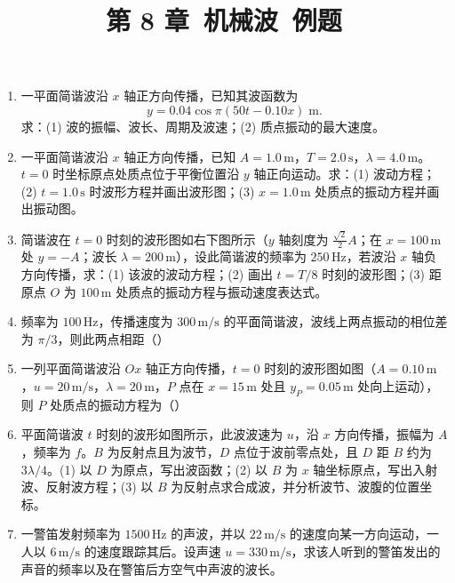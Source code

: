 \documentclass[12pt]{article}
\title{第 8 章\ 机械波\ 例题}
\author{}
\date{}
\begin{document}
\maketitle

\begin{enumerate}[label=\textbf{例\arabic*.}, leftmargin=*]

\item 一平面简谐波沿 $x$ 轴正方向传播，已知其波函数为
\[
  y = 0.04\cos\pi(50t-0.10x)\;\mathrm{m}.
\]
求：(1) 波的振幅、波长、周期及波速；(2) 质点振动的最大速度。

\item 一平面简谐波沿 $x$ 轴正方向传播，已知 $A=1.0\,\mathrm{m}$，$T=2.0\,\mathrm{s}$，$\lambda=4.0\,\mathrm{m}$。$t=0$ 时坐标原点处质点位于平衡位置沿 $y$ 轴正向运动。求：(1) 波动方程；(2) $t=1.0\,\mathrm{s}$ 时波形方程并画出波形图；(3) $x=1.0\,\mathrm{m}$ 处质点的振动方程并画出振动图。

\item 简谐波在 $t=0$ 时刻的波形图如右下图所示（$y$ 轴刻度为 $\frac{\sqrt{2}}{2}A$；在 $x=100\,\mathrm{m}$ 处 $y=-A$；波长 $\lambda=200\,\mathrm{m}$），设此简谐波的频率为 $250\,\mathrm{Hz}$，若波沿 $x$ 轴负方向传播，求：(1) 该波的波动方程；(2) 画出 $t=T/8$ 时刻的波形图；(3) 距原点 $O$ 为 $100\,\mathrm{m}$ 处质点的振动方程与振动速度表达式。

\item 频率为 $100\,\mathrm{Hz}$，传播速度为 $300\,\mathrm{m/s}$ 的平面简谐波，波线上两点振动的相位差为 $\pi/3$，则此两点相距（\quad）

\item 一列平面简谐波沿 $Ox$ 轴正方向传播，$t=0$ 时刻的波形图如图（$A=0.10\,\mathrm{m}$，$u=20\,\mathrm{m/s}$，$\lambda=20\,\mathrm{m}$，$P$ 点在 $x=15\,\mathrm{m}$ 处且 $y_P=0.05\,\mathrm{m}$ 处向上运动），则 $P$ 处质点的振动方程为（\quad）

\item 平面简谐波 $t$ 时刻的波形如图所示，此波波速为 $u$，沿 $x$ 方向传播，振幅为 $A$，频率为 $f$。$B$ 为反射点且为波节，$D$ 点位于波前零点处，且 $D$ 距 $B$ 约为 $3\lambda/4$。(1) 以 $D$ 为原点，写出波函数；(2) 以 $B$ 为 $x$ 轴坐标原点，写出入射波、反射波方程；(3) 以 $B$ 为反射点求合成波，并分析波节、波腹的位置坐标。

\item 一警笛发射频率为 $1500\,\mathrm{Hz}$ 的声波，并以 $22\,\mathrm{m/s}$ 的速度向某一方向运动，一人以 $6\,\mathrm{m/s}$ 的速度跟踪其后。设声速 $u=330\,\mathrm{m/s}$，求该人听到的警笛发出的声音的频率以及在警笛后方空气中声波的波长。


\end{enumerate}
\end{document}
